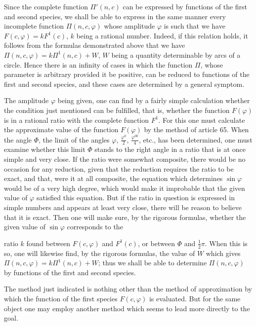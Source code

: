 \documentclass{article}
\begin{document}
Since the complete function $\Pi'(n,c)$ can be expressed by functions of the first and second species, we shall be able to express in the same manner every incomplete function $\Pi(n,c,\varphi)$ whose amplitude $\varphi$ is such that we have $F(c,\varphi)=kF^{1}(c)$, $k$ being a rational number. Indeed, if this relation holds, it follows from the formulas demonstrated above that we have $\Pi(n,c,\varphi)=k\Pi^{1}(n,c)+W$, $W$ being a quantity determinable by arcs of a circle. Hence there is an infinity of cases in which the function $\Pi$, whose parameter is arbitrary provided it be positive, can be reduced to functions of the first and second species, and these cases are determined by a general symptom.

The amplitude $\varphi$ being given, one can find by a fairly simple calculation whether the condition just mentioned can be fulfilled, that is, whether the function $F(\varphi)$ is in a rational ratio with the complete function $F^{1}$. For this one must calculate the approximate value of the function $F(\varphi)$ by the method of article 65. When the angle $\Phi$, the limit of the angles $\varphi$, $\frac{\varphi^{0}}{2}$, $\frac{\varphi^{00}}{4}$, etc., has been determined, one must examine whether this limit $\Phi$ stands to the right angle in a ratio that is at once simple and very close. If the ratio were somewhat composite, there would be no occasion for any reduction, given that the reduction requires the ratio to be exact, and that, were it at all composite, the equation which determines $\sin\varphi$ would be of a very high degree, which would make it improbable that the given value of $\varphi$ satisfied this equation. But if the ratio in question is expressed in simple numbers and appears at least very close, there will be reason to believe that it is exact. Then one will make sure, by the rigorous formulas, whether the given value of $\sin\varphi$ corresponds to the

ratio $k$ found between $F(c,\varphi)$ and $F^{1}(c)$, or between $\Phi$ and $\tfrac{1}{2}\pi$. When this is so, one will likewise find, by the rigorous formulas, the value of $W$ which gives $\Pi(n,c,\varphi)=k\Pi^{1}(n,c)+W$; thus we shall be able to determine $\Pi(n,c,\varphi)$ by functions of the first and second species.

The method just indicated is nothing other than the method of approximation by which the function of the first species $F(c,\varphi)$ is evaluated. But for the same object one may employ another method which seems to lead more directly to the goal.
\end{document}

